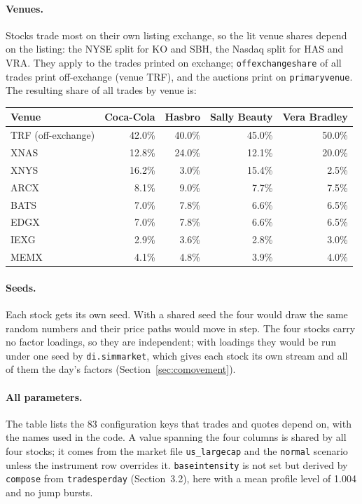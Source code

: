 \documentclass[11pt,a4paper]{article}
\newcommand{\key}[1]{\texttt{#1}}
\theoremstyle{paper}
\begin{document}
\paragraph{Venues.} Stocks trade most on their own listing exchange, so the lit venue shares depend on the listing: the NYSE split for KO and SBH, the Nasdaq split for HAS and VRA. They apply to the trades printed on exchange; \key{offexchangeshare} of all trades print off-exchange (venue TRF), and the auctions print on \key{primaryvenue}. The resulting share of all trades by venue is:

\begin{center}
\small
\begin{tabular}{@{}lrrrr@{}}
\toprule
\textbf{Venue} & \textbf{Coca-Cola} & \textbf{Hasbro} & \textbf{Sally Beauty} & \textbf{Vera Bradley}\\
\midrule
TRF (off-exchange) & 42.0\% & 40.0\% & 45.0\% & 50.0\%\\
XNAS & 12.8\% & 24.0\% & 12.1\% & 20.0\%\\
XNYS & 16.2\% & 3.0\% & 15.4\% & 2.5\%\\
ARCX & 8.1\% & 9.0\% & 7.7\% & 7.5\%\\
BATS & 7.0\% & 7.8\% & 6.6\% & 6.5\%\\
EDGX & 7.0\% & 7.8\% & 6.6\% & 6.5\%\\
IEXG & 2.9\% & 3.6\% & 2.8\% & 3.0\%\\
MEMX & 4.1\% & 4.8\% & 3.9\% & 4.0\%\\
\bottomrule
\end{tabular}
\end{center}

\paragraph{Seeds.} Each stock gets its own seed. With a shared seed the four would draw the same random numbers and their price paths would move in step. The four stocks carry no factor loadings, so they are independent; with loadings they would be run under one seed by \key{di.simmarket}, which gives each stock its own stream and all of them the day's factors (Section~\ref{sec:comovement}).

\paragraph{All parameters.} The table lists the 83 configuration keys that trades and quotes depend on, with the names used in the code. A value spanning the four columns is shared by all four stocks; it comes from the market file \key{us\_largecap} and the \key{normal} scenario unless the instrument row overrides it. \key{baseintensity} is not set but derived by \key{compose} from \key{tradesperday} (Section~3.2), here with a mean profile level of 1.004 and no jump bursts.
\end{document}
